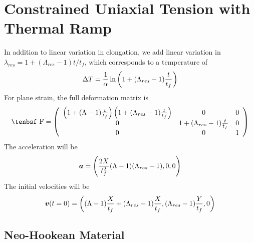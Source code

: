 \documentclass[11pt]{book}
\renewcommand{\vec}[1]{\boldsymbol{#1}}
\def\F{\hbox{\tenbsf F}}
\begin{document}
\section{Constrained Uniaxial Tension with Thermal Ramp}

In addition to linear variation in elongation, we add linear variation in $\lambda_{res} = 1 + (\Lambda_{res}-1)t/t_f$, which corresponds to a temperature of
\begin{equation}
     \Delta T = {1\over\alpha}\ln \left(1 + (\Lambda_{res}-1){t\over t_f}\right)
\end{equation}
For plane strain, the full deformation matrix is
\begin{equation}
    \F = \left(\begin{array}{ccc} \left(1+(\Lambda-1){t\over t_f}\right)\left(1 + (\Lambda_{res}-1){t\over t_f}\right) & 0 & 0 \\
               0 & 1 + (\Lambda_{res}-1){t\over t_f} & 0 \\
               0 & 0 & 1 \end{array} \right)
\end{equation}
The acceleration will be
\begin{equation}
     \vec a = \left( {2X\over t_f^2}(\Lambda-1)(\Lambda_{res}-1),0,0 \right)
\end{equation}
The initial velocities will be
\begin{equation}
   \vec v(t=0) = \left( (\Lambda-1){X\over t_f} + (\Lambda_{res}-1){X\over t_f}, (\Lambda_{res}-1){Y\over t_f},0\right)
\end{equation}

\subsection{Neo-Hookean Material}
\end{document}
